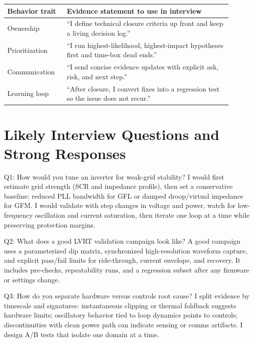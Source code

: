 \documentclass[11pt]{article}
\begin{document}
\begin{table}[h]
\centering
\begin{tabular}{p{0.24\linewidth}p{0.67\linewidth}}
\toprule
Behavior trait & Evidence statement to use in interview \\
\midrule
Ownership & ``I define technical closure criteria up front and keep a living decision log.'' \\
Prioritization & ``I run highest-likelihood, highest-impact hypotheses first and time-box dead ends.'' \\
Communication & ``I send concise evidence updates with explicit ask, risk, and next step.'' \\
Learning loop & ``After closure, I convert fixes into a regression test so the issue does not recur.'' \\
\bottomrule
\end{tabular}
\end{table}

\section{Likely Interview Questions and Strong Responses}

\begin{answerbox}{Q1: How would you tune an inverter for weak-grid stability?}
I would first estimate grid strength (SCR and impedance profile), then set a
conservative baseline: reduced PLL bandwidth for GFL or damped droop/virtual
impedance for GFM. I would validate with step changes in voltage and power,
watch for low-frequency oscillation and current saturation, then iterate one
loop at a time while preserving protection margins.
\end{answerbox}

\begin{answerbox}{Q2: What does a good LVRT validation campaign look like?}
A good campaign uses a parameterized dip matrix, synchronized high-resolution
waveform capture, and explicit pass/fail limits for ride-through, current
envelope, and recovery. It includes pre-checks, repeatability runs, and a
regression subset after any firmware or settings change.
\end{answerbox}

\begin{answerbox}{Q3: How do you separate hardware versus controls root cause?}
I split evidence by timescale and signatures: instantaneous clipping or thermal
foldback suggests hardware limits; oscillatory behavior tied to loop dynamics
points to controls; discontinuities with clean power path can indicate sensing
or comms artifacts. I design A/B tests that isolate one domain at a time.
\end{answerbox}
\end{document}
